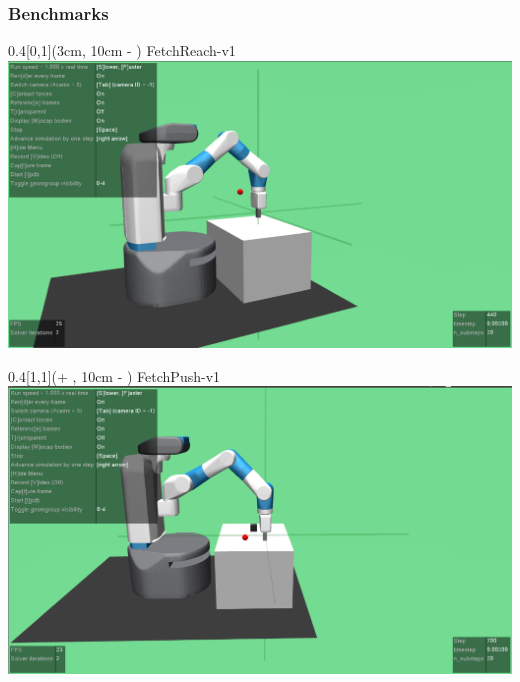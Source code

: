 \begin{frame}
	\frametitle{Benchmarks}	
	\vspace{1cm}

	
	
	\begin{textblock*}{0.4\paperwidth}[0,1](3cm, 10cm - \PraesentationSeitenrand)%
		FetchReach-v1
		\includegraphics[width=0.3\paperwidth]{./Ressourcen/Figures/FetchReach-v1.pdf}
	\end{textblock*}
	
	\begin{textblock*}{0.4\paperwidth}[1,1](\textwidth + \PraesentationSeitenrand, 10cm - \PraesentationSeitenrand)%
		FetchPush-v1
		\includegraphics[width=0.3\paperwidth]{./Ressourcen/Figures/FetchPush-v1.pdf}
	\end{textblock*}
	

\end{frame}
